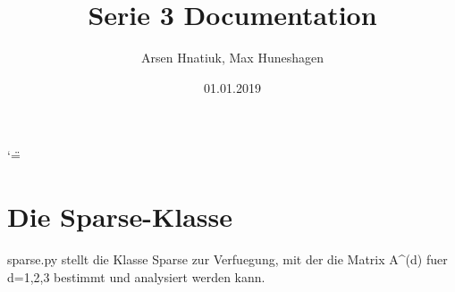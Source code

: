 \documentclass[letterpaper,10pt,ngerman]{sphinxmanual}
\title{Serie 3 Documentation}
\date{01.01.2019}
\author{Arsen Hnatiuk, Max Huneshagen}
\begin{document}
\ifnum\catcode`\"=\active{}\fi
\maketitle
\sphinxtableofcontents
{}\label{\detokenize{index::doc}}



\chapter{Die Sparse-Klasse}
\label{\detokenize{index:welcome-to-serie-3-s-documentation}}\label{\detokenize{index:die-sparse-klasse}}\label{\detokenize{index:module-sparse_erw}}
sparse.py stellt die Klasse Sparse zur Verfuegung, mit der die Matrix A\textasciicircum{}(d) fuer d=1,2,3
bestimmt und analysiert werden kann.
\end{document}
